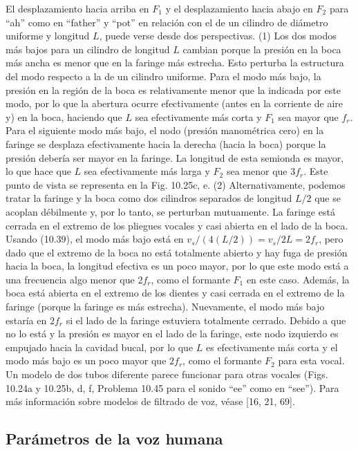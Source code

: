 \documentclass[12pt]{book}
\begin{document}
El desplazamiento hacia arriba en $F_1$ y el desplazamiento hacia abajo en $F_2$ para ``ah'' como en ``father'' y ``pot'' en relación con el de un cilindro de diámetro uniforme y longitud $L$, puede verse desde dos perspectivas. (1) Los dos modos más bajos para un cilindro de longitud $L$ cambian porque la presión en la boca más ancha es menor que en la faringe más estrecha. Esto perturba la estructura del modo respecto a la de un cilindro uniforme. Para el modo más bajo, la presión en la región de la boca es relativamente menor que la indicada por este modo, por lo que la abertura ocurre efectivamente (antes en la corriente de aire y) en la boca, haciendo que $L$ sea efectivamente más corta y $F_1$ sea mayor que $f_r$. Para el siguiente modo más bajo, el nodo (presión manométrica cero) en la faringe se desplaza efectivamente hacia la derecha (hacia la boca) porque la presión debería ser mayor en la faringe. La longitud de esta semionda es mayor, lo que hace que $L$ sea efectivamente más larga y $F_2$ sea menor que $3f_r$. Este punto de vista se representa en la Fig. 10.25c, e. (2) Alternativamente, podemos tratar la faringe y la boca como dos cilindros separados de longitud $L/2$ que se acoplan débilmente y, por lo tanto, se perturban mutuamente. La faringe está cerrada en el extremo de los pliegues vocales y casi abierta en el lado de la boca. Usando (10.39), el modo más bajo está en $v_s/(4(L/2)) = v_s/2L = 2f_r$, pero dado que el extremo de la boca no está totalmente abierto y hay fuga de presión hacia la boca, la longitud efectiva es un poco mayor, por lo que este modo está a una frecuencia algo menor que $2f_r$, como el formante $F_1$ en este caso. Además, la boca está abierta en el extremo de los dientes y casi cerrada en el extremo de la faringe (porque la faringe es más estrecha). Nuevamente, el modo más bajo estaría en $2f_r$ si el lado de la faringe estuviera totalmente cerrado. Debido a que no lo está y la presión es mayor en el lado de la faringe, este nodo izquierdo es empujado hacia la cavidad bucal, por lo que $L$ es efectivamente más corta y el modo más bajo es un poco mayor que $2f_r$, como el formante $F_2$ para esta vocal. Un modelo de dos tubos diferente parece funcionar para otras vocales (Figs. 10.24a y 10.25b, d, f, Problema 10.45 para el sonido ``ee'' como en ``see''). Para más información sobre modelos de filtrado de voz, véase [16, 21, 69].

\subsection{Parámetros de la voz humana}
\end{document}
